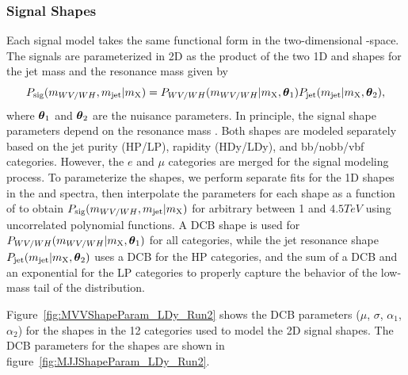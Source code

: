 \subsubsection{Signal Shapes}

Each signal model takes the same functional form in the two-dimensional \MJ-\MVV space.
The signals are parameterized in 2D as the product of the two 1D \MJ and \MVV shapes for the jet mass and the resonance mass given by
\begin{equation}
  P_\mathrm{sig}(m_{WV/WH},m_\mathrm{jet}|m_\mathrm{X})=P_{WV/WH}(m_{WV/WH}|m_\mathrm{X},\vb*{\theta}_1)P_\mathrm{jet}(m_\mathrm{jet}|m_\mathrm{X},\vb*{\theta}_2),
\end{equation}
where $\vb*{\theta}_1$ and $\vb*{\theta}_2$ are the nuisance parameters.
In principle, the signal shape parameters depend on the resonance mass \MX.
Both shapes are modeled separately based on the jet purity (HP/LP), rapidity (HDy/LDy), and bb/nobb/vbf categories.
However, the $e$ and $\mu$ categories are merged for the signal modeling process.
To parameterize the shapes, we perform separate fits for the 1D shapes in the \MVV and \MJ spectra, then interpolate the parameters for each shape as a function of \MX to obtain $P_\mathrm{sig}(m_{WV/WH},m_\mathrm{jet}|m_\mathrm{X})$ for arbitrary \MX between 1 and $4.5\unit{TeV}$ using uncorrelated polynomial functions.
A DCB shape is used for $P_{WV/WH}(m_{WV/WH}|m_\mathrm{X},\vb*{\theta}_1)$ for all categories, while the jet resonance shape $P_\mathrm{jet}(m_\mathrm{jet}|m_\mathrm{X},\vb*{\theta}_2)$ uses a DCB for the HP categories, and the sum of a DCB and an exponential for the LP categories to properly capture the behavior of the low-mass tail of the distribution.

Figure~\ref{fig:MVVShapeParam_LDy_Run2} shows the DCB parameters ($\mu$, $\sigma$, $\alpha_1$, $\alpha_2$) for the \MVV shapes in the 12 categories used to model the 2D signal shapes.
The DCB parameters for the \MJ shapes are shown in figure~\ref{fig:MJJShapeParam_LDy_Run2}.

